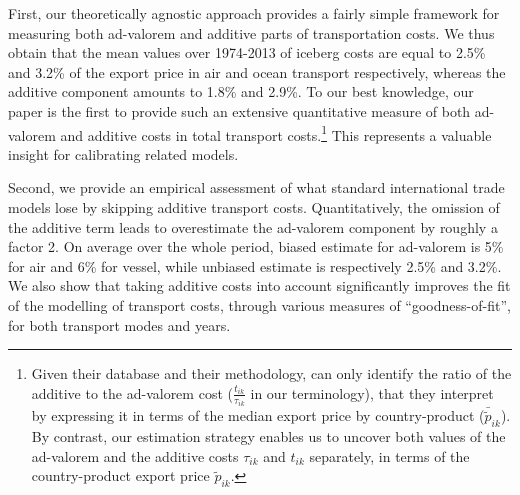 \documentclass[a4paper,11pt]{article}
\begin{document}
First, our theoretically agnostic approach provides a fairly simple framework for measuring both ad-valorem and additive parts of transportation costs. We thus obtain that the mean values over 1974-2013 of iceberg costs are equal to 2.5\% and 3.2\% of the export price in air and ocean transport respectively, whereas the additive component amounts to 1.8\% and 2.9\%. To our best knowledge, our paper is the first to provide such an extensive quantitative measure of both ad-valorem and additive costs in total transport costs.\footnote{Given their database and their methodology, \citet{Irrazabal_2015} can only identify the ratio of the additive to the ad-valorem cost ($\frac{t_{ik}}{\tau_{ik}}$ in our terminology), that they interpret by expressing it in terms of the median export price by country-product ($\bar{\widetilde{p}}_{ik}$). By contrast, our estimation strategy enables us to uncover both values of the ad-valorem and the additive costs $\tau_{ik}$ and $t_{ik}$ separately, in terms of the country-product export price $\widetilde{p}_{ik}$.}  This represents a valuable insight for calibrating related models.


Second, we provide an empirical assessment of what standard international trade models lose by skipping additive transport costs. Quantitatively, the omission of the additive term leads to overestimate the ad-valorem component by roughly a factor 2. On average over the whole period, biased estimate for ad-valorem is 5\% for air and 6\% for vessel, while unbiased estimate is respectively 2.5\% and 3.2\%. We also show that taking additive costs into account significantly improves the fit of the modelling of transport costs, through various measures of ``goodness-of-fit'', for both transport modes and years.
\end{document}
